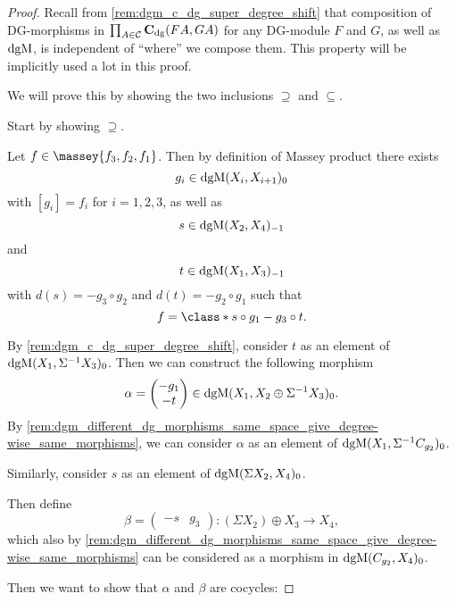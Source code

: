 \begin{proof}
    Recall from \autoref{rem:dgm_c_dg_super_degree_shift} that composition of DG-morphisms in \( \prod_{A \in {\mathcal{C}}} \operatorname{\mathbf{C}}_{\operatorname{dg}}(F A, G A) \) for any DG-module \( F \) and \( G \), as well as \( \operatorname{dgM} \), is independent of ``where'' we compose them. This property will be implicitly used a lot in this proof.

    We will prove this by showing the two inclusions \( \supseteq \) and \( \subseteq \).

    Start by showing \( \supseteq \).

    Let \( f \in \massey{f_3, f_2, f_1} \). Then by definition of Massey product there exists
    \[
        g_i \in \operatorname{dgM}(X_i, X_{i + 1})_0
    \]
    with \( [g_i] = f_i \) for \( i = 1, 2, 3 \), as well as
    \[
        s \in \operatorname{dgM}(X_2, X_4)_{-1}
    \]
    and
    \[
        t \in \operatorname{dgM}(X_1, X_3)_{-1}
    \]
    with \( d(s) = - g_3 \circ g_2 \) and \( d(t) = - g_2 \circ g_1 \) such that
    \[
        f = \class*{s \circ g_1 - g_3 \circ t}.
    \]

    By \autoref{rem:dgm_c_dg_super_degree_shift}, consider \( t \) as an element of \( \operatorname{dgM}(X_1, \Sigma^{-1} X_3)_0 \). Then we can construct the following morphism
    \[
        \alpha =
        \begin{pmatrix}
            - g_1 \\
            - t
        \end{pmatrix}
        \in \operatorname{dgM}(X_1, X_2 \oplus \Sigma^{-1} X_3)_0.
    \]
    By \autoref{rem:dgm_different_dg_morphisms_same_space_give_degree-wise_same_morphisms}, we can consider \( \alpha \) as an element of \( \operatorname{dgM}(X_1, \Sigma^{-1} C_{g_2})_0 \).

    Similarly, consider \( s \) as an element of \( \operatorname{dgM}(\Sigma X_2, X_4)_0 \).

    Then define
    \[
        \beta =
        \begin{pmatrix}
            - s & g_3
        \end{pmatrix}
        : (\Sigma X_2) \oplus X_3 \to X_4,
    \]
    which also by \autoref{rem:dgm_different_dg_morphisms_same_space_give_degree-wise_same_morphisms} can be considered as a morphism in \( \operatorname{dgM}(C_{g_2}, X_4)_0 \).

    Then we want to show that \( \alpha \) and \( \beta \) are cocycles:


\end{proof}
